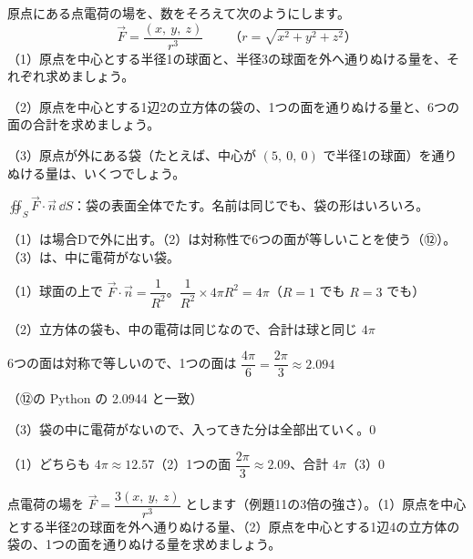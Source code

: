 \begin{reidai}
原点にある点電荷の場を、数をそろえて次のようにします。
\[ \vec F=\frac{(x,\ y,\ z)}{r^3}\qquad（r=\sqrt{x^2+y^2+z^2}） \]
（1）原点を中心とする半径1の球面と、半径3の球面を外へ通りぬける量を、それぞれ求めましょう。\par
（2）原点を中心とする1辺2の立方体の袋の、1つの面を通りぬける量と、6つの面の合計を求めましょう。\par
（3）原点が外にある袋（たとえば、中心が $(5,\ 0,\ 0)$ で半径1の球面）を通りぬける量は、いくつでしょう。\par
\kangaekata {}\par
{}\enspace $\displaystyle\oiint_S\vec F\cdot\vec n\,\dd S$：袋の表面全体でたす。名前は同じでも、袋の形はいろいろ。\par
{}\enspace （1）は場合Dで外に出す。（2）は対称性で6つの面が等しいことを使う（⑫）。（3）は、中に電荷がない袋。\par
\shiki\kviiiis{}\zw{} （1）球面の上で $\vec F\cdot\vec n=\dfrac{1}{R^2}$。$\dfrac{1}{R^2}\times4\pi R^2=4\pi$（$R=1$ でも $R=3$ でも）\par
\kviiiia （2）立方体の袋も、中の電荷は同じなので、合計は球と同じ $4\pi$\par
\kviiiib 6つの面は対称で等しいので、1つの面は $\dfrac{4\pi}{6}=\dfrac{2\pi}{3}\approx2.094$\par
\kviiiib （⑫の Python の 2.0944 と一致）\par
\kviiiia （3）袋の中に電荷がないので、入ってきた分は全部出ていく。0\par
\kotae\kviiiis{}\zw{} （1）どちらも $4\pi\approx12.57$\quad （2）1つの面 $\dfrac{2\pi}{3}\approx2.09$、合計 $4\pi$\quad （3）0
\end{reidai}

\begin{jibun}
点電荷の場を $\vec F=\dfrac{3(x,\ y,\ z)}{r^3}$ とします（例題11の3倍の強さ）。（1）原点を中心とする半径2の球面を外へ通りぬける量、（2）原点を中心とする1辺4の立方体の袋の、1つの面を通りぬける量を求めましょう。
\end{jibun}

